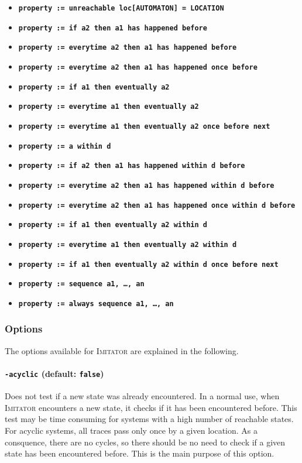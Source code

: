 \documentclass[a4paper,11pt]{article}
\newcommand{\imitator}{\textsc{Imitator}}
\newcommand{\code}[1]{\textbf{\texttt{#1}}}
\begin{document}
\begin{itemize}
	\item \code{property := unreachable loc[AUTOMATON] = LOCATION}
	\item \code{property := if a2 then a1 has happened before}
	\item \code{property := everytime a2 then a1 has happened before}
	\item \code{property := everytime a2 then a1 has happened once before}
	\item \code{property := if a1 then eventually a2}
	\item \code{property := everytime a1 then eventually a2}
	\item \code{property := everytime a1 then eventually a2 once before next}
	\item \code{property := a within d}
	\item \code{property := if a2 then a1 has happened within d before}
	\item \code{property := everytime a2 then a1 has happened within d before}
	\item \code{property := everytime a2 then a1 has happened once within d before}
	\item \code{property := if a1 then eventually a2 within d}
	\item \code{property := everytime a1 then eventually a2 within~d}
	\item \code{property := if a1 then eventually a2 within d once before next}
	\item \code{property := sequence a1, \dots, an}
	\item \code{property := always sequence a1, \dots, an}
\end{itemize}






\subsubsection{Options} \label{sss:options}

The options available for \imitator{} are explained in the following.

\paragraph{\code{-acyclic} (default: \code{false})}
Does not test if a new state was already encountered.
In a normal use, when \imitator{} encounters a new state, it checks if it has been encountered before.
This test may be time consuming for systems with a high number of reachable states.
For acyclic systems, all traces pass only once by a given location.
As a consquence, there are no cycles, so there should be no need to check if a given state has been encountered before.
This is the main purpose of this option.
\end{document}
